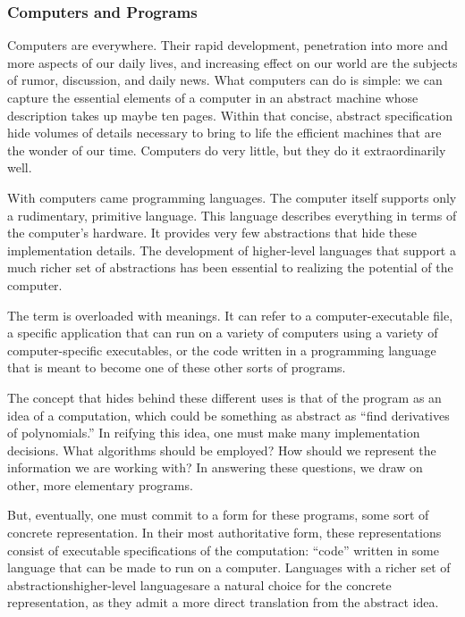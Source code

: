 \label{introduction:introduction}
\subsubsection*{Computers and Programs}
Computers are everywhere. Their rapid development, penetration into more and more aspects of our daily lives, and increasing effect on our world are the subjects of rumor, discussion, and daily news. What computers can do is simple: we can capture the essential elements of a computer in an abstract machine whose description takes up maybe ten pages. Within that concise, abstract specification hide volumes of details necessary to bring to life the efficient machines that are the wonder of our time. Computers do very little, but they do it extraordinarily well.

With computers came programming languages. The computer itself supports only a rudimentary, primitive language. This language describes everything in terms of the computer's hardware. It provides very few abstractions that hide these implementation details. The development of higher-level languages that support a much richer set of abstractions has been essential to realizing the potential of the computer.

The term  is overloaded with meanings. It can refer to a computer-executable file, a specific application that can run on a variety of computers using a variety of computer-specific executables, or the code written in a programming language that is meant to become one of these other sorts of programs.

The concept that hides behind these different uses is that of the program as an idea of a computation, which could be something as abstract as ``find derivatives of polynomials.'' In reifying this idea, one must make many implementation decisions. What algorithms should be employed? How should we represent the information we are working with? In answering these questions, we draw on other, more elementary programs.

But, eventually, one must commit to a form for these programs, some sort of concrete representation. In their most authoritative form, these representations consist of executable specifications of the computation: ``code'' written in some language that can be made to run on a computer. Languages with a richer set of abstractions\empause higher-level languages\empause are a natural choice for the concrete representation, as they admit a more direct translation from the abstract idea.

